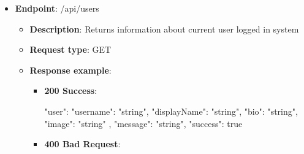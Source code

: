 \begin{itemize}
\begin{itemize}
\begin{itemize}
            \begin{spverbatim}
            {
                "errorMessage": "string",
                "errorDetails": "string",
                "statusCode": 0,
                "success": true
            }
            \end{spverbatim}
        \end{itemize}
        \item \textbf{Response messages}:
        \begin{enumerate}
            \item Success.
            \item User not found.
        \end{enumerate}
    \end{itemize}
    \item \textbf{Endpoint}: /api/users
    \begin{itemize}
        \item \textbf{Description}: Returns information about current user logged in system
        \item \textbf{Request type}: GET
        \item \textbf{Response example}:
        \begin{itemize}
            \item \textbf{200 Success}:
            \begin{spverbatim}
            {
                "user": {
                    "username": "string",
                    "displayName": "string",
                    "bio": "string",
                    "image": "string"
                },
                "message": "string",
                "success": true
            }
            \end{spverbatim}
            \item \textbf{400 Bad Request}:


\end{itemize}
\end{itemize}
\end{itemize}
